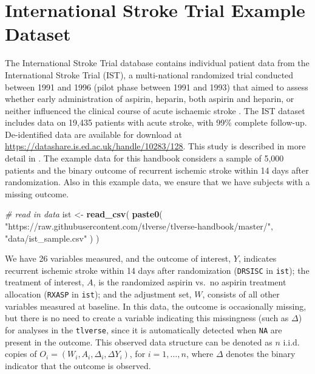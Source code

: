 \documentclass[12pt, krantz2,]{book}
\newenvironment{Shaded}{\begin{snugshade}}{\end{snugshade}}
\newcommand{\CommentTok}[1]{\textcolor[rgb]{0.56,0.35,0.01}{\textit{#1}}}
\newcommand{\KeywordTok}[1]{\textcolor[rgb]{0.13,0.29,0.53}{\textbf{#1}}}
\newcommand{\NormalTok}[1]{#1}
\newcommand{\StringTok}[1]{\textcolor[rgb]{0.31,0.60,0.02}{#1}}
\theoremstyle{definition}
\theoremstyle{definition}
\theoremstyle{definition}
\newcommand{\1}{\mathbbm{1}}
\begin{document}
\hypertarget{ist}{%
\section{International Stroke Trial Example Dataset}\label{ist}}

The International Stroke Trial database contains individual patient data from
the International Stroke Trial (IST), a multi-national randomized trial
conducted between 1991 and 1996 (pilot phase between 1991 and 1993) that aimed
to assess whether early administration of aspirin, heparin, both aspirin and
heparin, or neither influenced the clinical course of acute ischaemic stroke
\citep{sandercock1997international}. The IST dataset includes data on 19,435 patients
with acute stroke, with 99\% complete follow-up. De-identified data are
available for download at \url{https://datashare.is.ed.ac.uk/handle/10283/128}. This
study is described in more detail in \citet{sandercock2011international}. The example
data for this handbook considers a sample of 5,000 patients and the binary
outcome of recurrent ischemic stroke within 14 days after randomization. Also
in this example data, we ensure that we have subjects with a missing outcome.

\begin{Shaded}
\begin{Highlighting}[]
\CommentTok{# read in data}
\NormalTok{ist <-}\StringTok{ }\KeywordTok{read_csv}\NormalTok{(}
  \KeywordTok{paste0}\NormalTok{(}
    \StringTok{"https://raw.githubusercontent.com/tlverse/tlverse-handbook/master/"}\NormalTok{,}
    \StringTok{"data/ist_sample.csv"}
\NormalTok{  )}
\NormalTok{)}
\end{Highlighting}
\end{Shaded}

We have 26 variables measured, and the outcome of interest, \(Y\),
indicates recurrent ischemic stroke within 14 days after randomization (\texttt{DRSISC}
in \texttt{ist}); the treatment of interest, \(A\), is the randomized aspirin vs.~no
aspirin treatment allocation (\texttt{RXASP} in \texttt{ist}); and the adjustment set, \(W\),
consists of all other variables measured at baseline. In this data, the outcome
is occasionally missing, but there is no need to create a variable indicating
this missingness (such as \(\Delta\)) for analyses in the \texttt{tlverse}, since it is
automatically detected when \texttt{NA} are present in the outcome. This observed data
structure can be denoted as \(n\) i.i.d. copies of \(O_i = (W_i, A_i, \Delta_i, \Delta Y_i)\), for \(i = 1, \ldots, n\), where \(\Delta\) denotes the binary
indicator that the outcome is observed.
\end{document}
